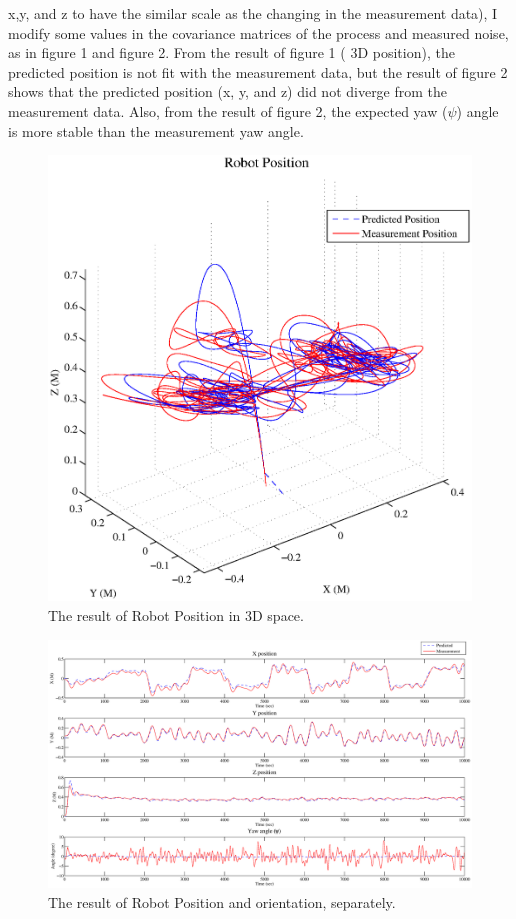 \documentclass[10pt,letterpaper]{article}
\begin{document}
x,y, and z to have the similar scale as the changing in the measurement data), I modify some values in the 
covariance matrices of the process and measured noise, as in figure 1 and figure 2. From the result of figure 
1 ( 3D position), the predicted position is not fit with the measurement data, but the result of figure 2 shows 
that the predicted position (x, y, and z) did not diverge from the measurement data. Also, from the result of 
figure 2, the expected yaw ($\psi$) angle is more stable than the measurement yaw angle.
 \begin{figure}[H]
	 \begin{center}
	 	\includegraphics[width=\textwidth]{part1_3d.eps}
	 	\caption{The result of Robot Position in 3D space.}
	 \end{center}
 \end{figure}
  \begin{figure}[H]
	 \begin{center}
	 	\includegraphics[width=\textwidth]{part1_xyz.eps}
	 	\caption{The result of Robot Position and orientation, separately.}
	 \end{center}
 \end{figure}
\end{document}
